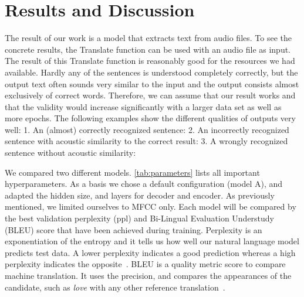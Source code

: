 \documentclass[11pt,a4paper]{article}
\begin{document}
\section{Results and Discussion}
The result of our work is a model that extracts text from audio files. 
To see the concrete results, the Translate function can be used with an audio file as input.
The result of this Translate function is reasonably good for the resources we had available.
Hardly any of the sentences is understood completely correctly, but the output text often sounds very similar to the input and the output consists almost exclusively of correct words.
Therefore, we can assume that our result works and that the validity would increase significantly with a larger data set as well as more epochs.
The following examples show the different qualities of outputs very well:
1. An (almost) correctly recognized sentence:
2. An incorrectly recognized sentence with acoustic similarity to the correct result:
3. A wrongly recognized sentence without acoustic similarity:


We compared two different models.
\autoref{tab:parameters} lists all important hyperparameters.
As a basis we chose a default configuration (model A), and adapted the hidden size, and layers for decoder and encoder.
As previously mentioned, we limited ourselves to MFCC only.
Each model will be compared by the best validation perplexity (ppl) and Bi-Lingual Evaluation Understudy (BLEU) score that have been achieved during training.
Perplexity is an exponentiation of the entropy and it tells us how well our natural language model predicts test data.
A lower perplexity indicates a good prediction whereas a high perplexity indicates the opposite~\cite{jozefowicz2016exploring}.
BLEU is a quality metric score to compare machine translation.
It uses the precision, and compares the appearances of the candidate, such as \textit{love} with any other reference translation~\cite{Papineni2002}.
\end{document}
